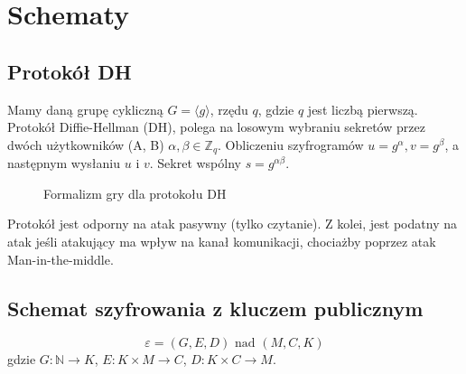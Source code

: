 \documentclass{../notatki}
\begin{document}
\section{Schematy}

\subsection{Protokół DH}

Mamy daną grupę cykliczną $G = \langle g \rangle$, rzędu
$q$, gdzie $q$ jest liczbą pierwszą.
Protokół Diffie-Hellman (DH), polega na losowym wybraniu sekretów przez dwóch
użytkowników (A, B) $\alpha, \beta \in \mathbb{Z}_q$. Obliczeniu szyfrogramów
$u = g^\alpha, v = g^\beta$, a następnym wysłaniu $u$ i $v$. Sekret wspólny
$s = g^{\alpha \beta}$.

\begin{figure}[H]
  \centering
  \caption{Formalizm gry dla protokołu DH}
\end{figure}

Protokół jest odporny na atak pasywny (tylko czytanie). Z kolei, jest podatny
na atak jeśli atakujący ma wpływ na kanał komunikacji, chociażby poprzez atak
Man-in-the-middle.

\subsection{Schemat szyfrowania z kluczem publicznym}

$$
\varepsilon = (G, E, D) \text{ nad } (M, C, K)
$$
gdzie $G: \mathbb{N} \to K$, $E: K \times M \to C$, $D: K \times C \to M$.
\end{document}
